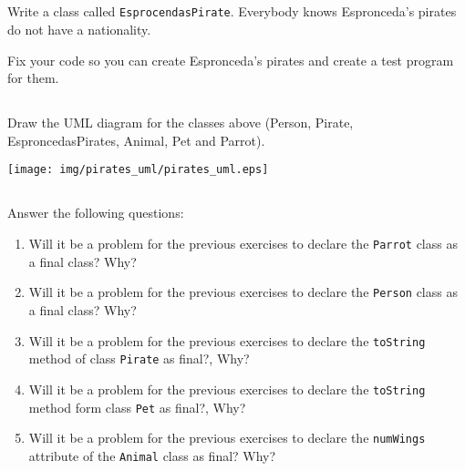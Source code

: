 \documentclass[a4paper, 11pt]{article}
\begin{document}
\subsection{}

Write a class called \verb+EsprocendasPirate+. Everybody knows Espronceda's
pirates do not have a nationality.

Fix your code so you can create Espronceda's pirates and create a test program
for them.








\subsection{}

Draw the UML diagram for the classes above (Person, Pirate, EsproncedasPirates,
Animal, Pet and Parrot).

\begin{solution}
  \centering
    \texttt{[image: img/pirates\_uml/pirates\_uml.eps]}
\end{solution}










\subsection{}

Answer the following questions:

\begin{enumerate}

  \item Will it be a problem for the previous exercises to declare the
    \verb+Parrot+ class as a final class? Why?

  \item Will it be a problem for the previous exercises to declare the
    \verb+Person+ class as a final class? Why?

  \item Will it be a problem for the previous exercises to declare the
    \verb+toString+ method of class \verb+Pirate+ as final?, Why?

  \item Will it be a problem for the previous exercises to declare the
    \verb+toString+ method form class \verb+Pet+ as final?, Why?

  \item Will it be a problem for the previous exercises to declare the
    \verb+numWings+ attribute of the \verb+Animal+ class as final? Why?

\end{enumerate}
\end{document}
